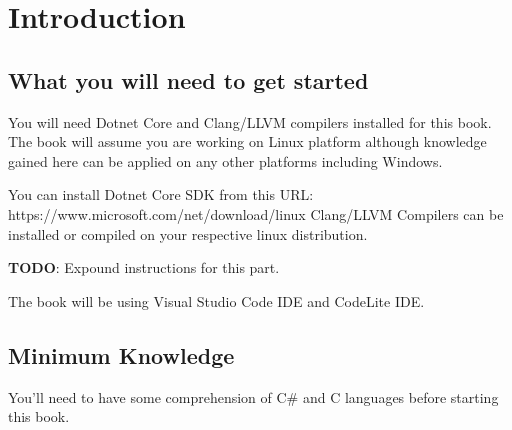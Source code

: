 \chapter{Introduction}
\section{What you will need to get started}
You will need Dotnet Core and Clang/LLVM compilers installed for this book. The book will assume you are working on Linux platform although knowledge gained here can be applied on any other platforms including Windows.

You can install Dotnet Core SDK from this URL: https://www.microsoft.com/net/download/linux
Clang/LLVM Compilers can be installed or compiled on your respective linux distribution.

\textbf{TODO}: Expound instructions for this part.

The book will be using Visual Studio Code IDE and CodeLite IDE.

\section{Minimum Knowledge}
You'll need to have some comprehension of C\# and C languages before starting this book.
